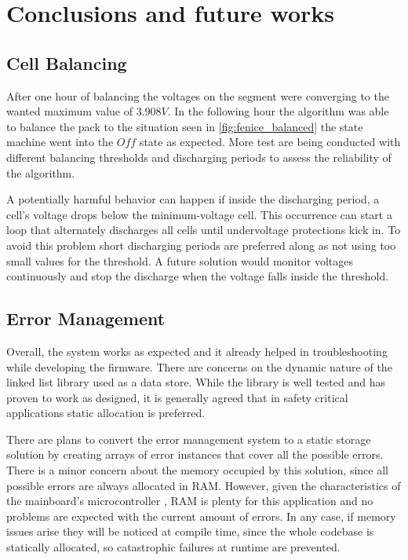 \chapter{Conclusions and future works}

\section{Cell Balancing}

After one hour of balancing the voltages on the segment were converging to the wanted maximum value of $3.908 V$. In the following hour the algorithm was able to balance the pack to the situation seen in \autoref{fig:fenice_balanced} the state machine went into the $Off$ state as expected. More test are being conducted with different balancing thresholds and discharging periods to assess the reliability of the algorithm.

A potentially harmful behavior can happen if inside the discharging period, a cell's voltage drops below the minimum-voltage cell. This occurrence can start a loop that alternately discharges all cells until undervoltage protections kick in. To avoid this problem short discharging periods are preferred along as not using too small values for the threshold. A future solution would monitor voltages continuously and stop the discharge when the voltage falls inside the threshold.


\section{Error Management}
Overall, the system works as expected and it already helped in troubleshooting while developing the firmware. There are concerns on the dynamic nature of the linked list library used as a data store. While the library is well tested and has proven to work as designed, it is generally agreed that in safety critical applications static allocation is preferred.

There are plans to convert the error management system to a static storage solution by creating arrays of error instances that cover all the possible errors. There is a minor concern about the memory occupied by this solution, since all possible errors are always allocated in RAM. However, given the characteristics of the mainboard's microcontroller \cite{f446re}, RAM is plenty for this application and no problems are expected with the current amount of errors. In any case, if memory issues arise they will be noticed at compile time, since the whole codebase is statically allocated, so catastrophic failures at runtime are prevented.

